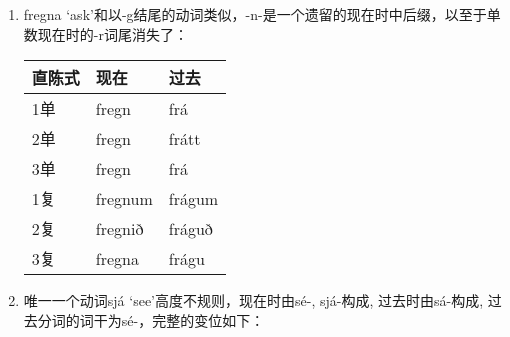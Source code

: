 \begin{enumerate}
    \item
          fregna `ask'和以-g结尾的动词类似，-n-是一个遗留的现在时中后缀，以至于单数现在时的-r词尾消失了：
          \begin{longtable}{lll}
              \toprule
              直陈式 & 现在      & 过去     \\
              \midrule
              \endhead
              \bottomrule
              \endfoot
              1单  & fregn   & frá    \\
              2单  & fregn   & frátt  \\
              3单  & fregn   & frá    \\
              1复  & fregnum & frágum \\
              2复  & fregnið & fráguð \\
              3复  & fregna  & frágu  \\
          \end{longtable}

    \item
          唯一一个动词sjá `see‌'高度不规则，现在时由sé-, sjá-构成, 过去时由sá-构成,
          过去分词的词干为sé-，完整的变位如下：


\end{enumerate}
